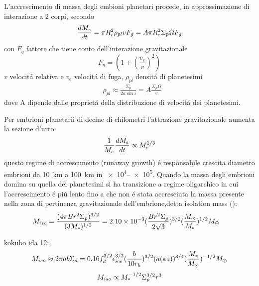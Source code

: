 L'accrescimento di massa degli embioni planetari procede, in approssimazione di interazione a 2 corpi, secondo
\begin{equation}
\TDy{t}{M_e}=\pi R_e^2\rho_{pl}v F_g=A\pi R_e^2\Sigma_p\Omega F_g\label{eq:Gaccretionpl}
\end{equation}
con $F_g$ fattore che tiene conto dell'interazione gravitazionale
\begin{equation}
F_g=(1+(\frac{v_e}{v})^2)
\end{equation}
$v$ velocit\'a relativa e $v_e$ velocit\'a di fuga, $\rho_{pl}$ densit\'a di planetesimi
\begin{align}
&\rho_{pl}\approx\frac{\Sigma_p}{2a\sin{i}}=A\frac{\Sigma_p\Omega}{v}
\end{align}
dove A dipende dalle propriet\'a della distribuzione di velocit\'a dei planetesimi.

Per embrioni planetarii di decine di chilometri l'attrazione gravitazionale aumenta la sezione d'urto: 
\begin{equation}
\frac{1}{M_e}\TDy{t}{M_e}\propto M_e\expy{1/3}
\end{equation}
questo regime di accrescimento (runaway growth) \'e responsabile crescita diametro embrioni da \SI{10}{\kilo\meter} a \SI{100}{\kilo\meter} in \SIrange{e4}{e5}{\year}.
Quando la massa degli embrioni domina su quella dei planetesimi si ha transizione a regime oligarchico in cui l'accrescimento \'e pi\'u lento fino a che non \'e stata accresciuta la massa presente nella zona di pertinenza gravitazionale dell'embrione,detta isolation mass (\cite{lissauer1993planet}):
\begin{align}
&M_{iso}=\frac{(4\pi Br^2\Sigma_p)\expy{3/2}}{(3M_*)\expy{1/2}}=\num{2.10e-3}(\frac{Br^2\Sigma_p}{2\sqrt{3}})\expy{3/2}(\frac{\msun{}}{M_*})\expy{1/2}\mearth{}
\end{align}

\begin{errata}
kokubo ida 12:
\[M_{iso}\approx2\pi ab\Sigma_d=0.16f_d\expy{3/2}\epsilon_{ice}\expy{3/2}(\frac{b}{10r_h})\expy{3/2}(a(\si{\astronomicalunit}))\expy{3/4}(\frac{M_*}{\msun{}})\expy{-1/2}\mearth{}\]
\begin{equation}
M_{iso}\propto M_*\expy{-1/2}\Sigma_p\expy{3/2}r^3
\end{equation}
\end{errata}


